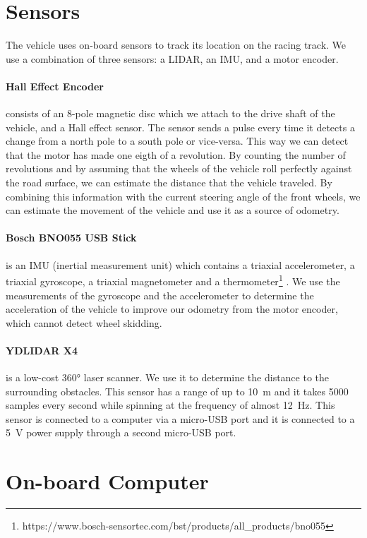 \section{Sensors}

The vehicle uses on-board sensors to track its location on the racing track. We use a combination of three sensors: a LIDAR, an IMU, and a motor encoder.

\paragraph{Hall Effect Encoder} consists of an 8-pole magnetic disc which we attach to the drive shaft of the vehicle, and a Hall effect sensor. The sensor sends a pulse every time it detects a change from a north pole to a south pole or vice-versa. This way we can detect that the motor has made one eigth of a revolution. By counting the number of revolutions and by assuming that the wheels of the vehicle roll perfectly against the road surface, we can estimate the distance that the vehicle traveled. By combining this information with the current steering angle of the front wheels, we can estimate the movement of the vehicle and use it as a source of odometry.

\paragraph{Bosch BNO055 USB Stick} is an IMU (inertial measurement unit) which contains a triaxial accelerometer, a triaxial gyroscope, a triaxial magnetometer and a thermometer\footnote{https://www.bosch-sensortec.com/bst/products/all\_products/bno055} . We use the measurements of the gyroscope and the accelerometer to determine the acceleration of the vehicle to improve our odometry from the motor encoder, which cannot detect wheel skidding.

\paragraph{YDLIDAR X4} is a low-cost \ang{360} laser scanner. We use it to determine the distance to the surrounding obstacles. This sensor has a range of up to \SI{10}{\meter} and it takes \num{5000} samples every second while spinning at the frequency of almost \SI{12}{\hertz}. This sensor is connected to a computer via a micro-USB port and it is connected to a \SI{5}{\volt} power supply through a second micro-USB port.

\section{On-board Computer}

